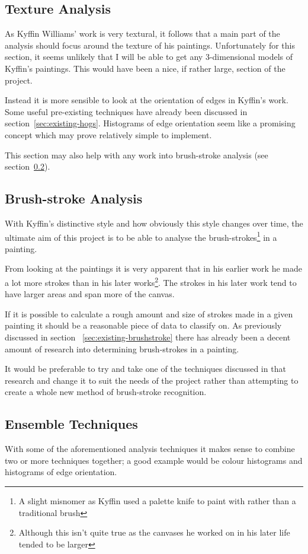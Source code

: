 \subsection{Texture Analysis}
As Kyffin Williams' work is very textural, it follows that a main part of the analysis should
focus around the texture of his paintings. Unfortunately for this section, it seems unlikely that
I will be able to get any 3-dimensional models of Kyffin's paintings. This would have been a nice,
if rather large, section of the project.

Instead it is more sensible to look at the orientation of edges in Kyffin's work. Some useful 
pre-existing techniques have already been discussed in section~\ref{sec:existing-hogs}. Histograms
of edge orientation\cite{Dalal2005Histograms} seem like a promising concept which may prove 
relatively simple to implement.

This section may also help with any work into brush-stroke analysis (see 
section~\ref{sec:analysis-brushstroke}).

\subsection{Brush-stroke Analysis}\label{sec:analysis-brushstroke}
With Kyffin's distinctive style and how obviously this style changes over time, the ultimate aim 
of this project is to be able to analyse the brush-strokes\footnote{A slight misnomer as Kyffin 
used a palette knife to paint with rather than a traditional brush} in a painting.

From looking at the paintings it is very apparent that in his earlier work he made a lot more 
strokes than in his later works\footnote{Although this isn't quite true as the canvases he worked
on in his later life tended to be larger}. The strokes in his later work tend to have larger areas
and span more of the canvas.

If it is possible to calculate a rough amount and size of strokes made in a given painting it 
should be a reasonable piece of data to classify on. As previously discussed in section~
\ref{sec:existing-brushstroke} there has already been a decent amount of research into determining
brush-strokes in a painting. 

It would be preferable to try and take one of the techniques discussed in that research and change
it to suit the needs of the project rather than attempting to create a whole new method of 
brush-stroke recognition.

\subsection{Ensemble Techniques}
With some of the aforementioned analysis techniques it makes sense to combine two or more 
techniques together; a good example would be colour histograms and histograms of edge orientation.

